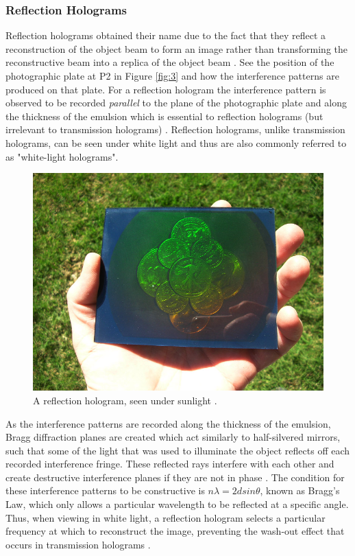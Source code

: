 \documentclass[12pt]{article}
\begin{document}
\subsubsection{Reflection Holograms} \label{sec:1.5.2}

Reflection holograms obtained their name due to the fact that they reflect a reconstruction of the object beam to form an image rather than transforming the reconstructive beam into a replica of the object beam \cite{princetonholo}.
See the position of the photographic plate at P2 in Figure \ref{fig:3} and how the interference patterns are produced on that plate.
For a reflection hologram the interference pattern is observed to be recorded \textit{parallel} to the plane of the photographic plate and along the thickness of the emulsion which is essential to reflection holograms (but irrelevant to transmission holograms) \cite{princetonholo}.
Reflection holograms, unlike transmission holograms, can be seen under white light and thus are also commonly referred to as "white-light holograms".

\begin{figure}[H]
    \centering
    \includegraphics[width=.5\textwidth]{reflection hologram.jpg}
    \caption{\centering A reflection hologram, seen under sunlight \protect\cite{reftransholo}.}
    \label{fig:8}
\end{figure}

As the interference patterns are recorded along the thickness of the emulsion, Bragg diffraction planes are created which act similarly to half-silvered mirrors, such that some of the light that was used to illuminate the object
reflects off each recorded interference fringe. These reflected rays interfere with each other and create destructive interference planes if they are not in phase \cite{princetonholo}. The condition for these interference patterns to be constructive is $n \lambda = 2 d sin \theta$, known as Bragg's Law, which only
allows a particular wavelength to be reflected at a specific angle. Thus, when viewing in white light, a reflection hologram selects a particular frequency at which to reconstruct the image, preventing the wash-out effect that occurs in transmission holograms \cite{princetonholo}.
\end{document}

